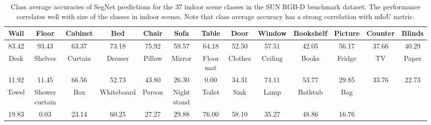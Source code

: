 \documentclass[10pt,journal,compsoc]{IEEEtran}
\begin{document}
\begin{table*}[t]
	\centering
	\tabcolsep=3pt
	\begin{tabular}{c|c|c|c|c|c|c|c|c|c|c|c|c}
\multicolumn{1}{c|}{Wall} & \multicolumn{1}{c|}{Floor} & \multicolumn{1}{c|}{Cabinet} & \multicolumn{1}{c|}{Bed} & \multicolumn{1}{c|}{Chair} & \multicolumn{1}{c|}{Sofa} & \multicolumn{1}{c|}{Table} & \multicolumn{1}{c|}{Door} & \multicolumn{1}{c|}{Window} & \multicolumn{1}{c|}{Bookshelf} & \multicolumn{1}{c|}{Picture} & \multicolumn{1}{c|}{Counter} & \multicolumn{1}{c}{Blinds} \\ \hline
		83.42                    & 93.43                       & 63.37                        & 73.18                     & 75.92                      & 59.57                      &       64.18                 & 52.50                      & 57.51                        & 42.05                           & 56.17                         & 37.66                        & 40.29                      \\ \hline
		Desk                       & Shelves                    & Curtain                      & Dresser                  & Pillow                     & Mirror                    & Floor mat                  & Clothes                   & Ceiling                     & Books                          & Fridge                       & TV                           & Paper                       \\ \hline
		11.92                      & 11.45                        & 66.56                         & 52.73                     & 43.80                       & 26.30                     & 0.00                       & 34.31                      & 74.11                        & 53.77                           & 29.85                         & 33.76                         & 22.73                       \\ \hline
		Towel                      & Shower curtain             & Box                          & Whiteboard               & Person                     & Night stand               & Toilet                     & Sink                      & Lamp                        & Bathtub                        & Bag                          & \multicolumn{2}{c}{\multirow{2}{*}{}}                     \\ \cline{1-11}
		19.83                       & 0.03                        & 23.14                          & 60.25                     & 27.27                       & 29.88                     & 76.00                       & 58.10                     & 35.27                        & 48.86                           & 16.76                          & \multicolumn{2}{c}{}                                      \\ \cline{1-11}
	\end{tabular}
	\vspace*{0.1cm}
	\caption{Class average accuracies of SegNet predictions for the 37 indoor scene classes in the SUN RGB-D benchmark dataset. The performance correlates well with size of the classes in indoor scenes. Note that class average accuracy has a strong correlation with mIoU metric.}
	\label{SUNRGBDClassavg}
\end{table*}
\end{document}
